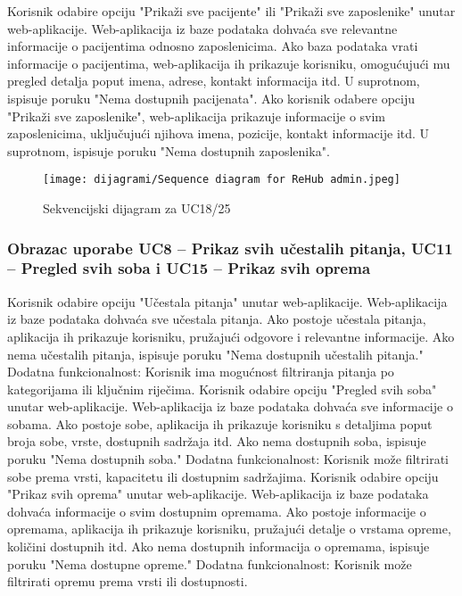                     Korisnik odabire opciju "Prikaži sve pacijente" ili "Prikaži sve zaposlenike" unutar web-aplikacije. Web-aplikacija iz baze podataka dohvaća sve relevantne informacije o pacijentima odnosno zaposlenicima. Ako baza podataka vrati informacije o pacijentima, web-aplikacija ih prikazuje korisniku, omogućujući mu pregled detalja poput imena, adrese, kontakt informacija itd. U suprotnom, ispisuje poruku "Nema dostupnih pacijenata". Ako korisnik odabere opciju "Prikaži sve zaposlenike", web-aplikacija prikazuje informacije o svim zaposlenicima, uključujući njihova imena, pozicije, kontakt informacije itd. U suprotnom, ispisuje poruku "Nema dostupnih zaposlenika".

                \begin{figure}[H]
			         \texttt{[image: dijagrami/Sequence diagram for ReHub admin.jpeg]}
			         \centering
			         \caption{Sekvencijski dijagram za UC18/25}
			         \label{fig:SequenceDiagram1}
		        \end{figure}

                \eject

                \subsubsection{Obrazac uporabe UC8 – Prikaz svih učestalih pitanja, UC11 – Pregled svih soba i UC15 – Prikaz svih oprema}

                    Korisnik odabire opciju "Učestala pitanja" unutar web-aplikacije. Web-aplikacija iz baze podataka dohvaća sve učestala pitanja. Ako postoje učestala pitanja, aplikacija ih prikazuje korisniku, pružajući odgovore i relevantne informacije. Ako nema učestalih pitanja, ispisuje poruku "Nema dostupnih učestalih pitanja." Dodatna funkcionalnost: Korisnik ima mogućnost filtriranja pitanja po kategorijama ili ključnim riječima. Korisnik odabire opciju "Pregled svih soba" unutar web-aplikacije. Web-aplikacija iz baze podataka dohvaća sve informacije o sobama. Ako postoje sobe, aplikacija ih prikazuje korisniku s detaljima poput broja sobe, vrste, dostupnih sadržaja itd. Ako nema dostupnih soba, ispisuje poruku "Nema dostupnih soba." Dodatna funkcionalnost: Korisnik može filtrirati sobe prema vrsti, kapacitetu ili dostupnim sadržajima. Korisnik odabire opciju "Prikaz svih oprema" unutar web-aplikacije. Web-aplikacija iz baze podataka dohvaća informacije o svim dostupnim opremama. Ako postoje informacije o opremama, aplikacija ih prikazuje korisniku, pružajući detalje o vrstama opreme, količini dostupnih itd. Ako nema dostupnih informacija o opremama, ispisuje poruku "Nema dostupne opreme." Dodatna funkcionalnost: Korisnik može filtrirati opremu prema vrsti ili dostupnosti.

